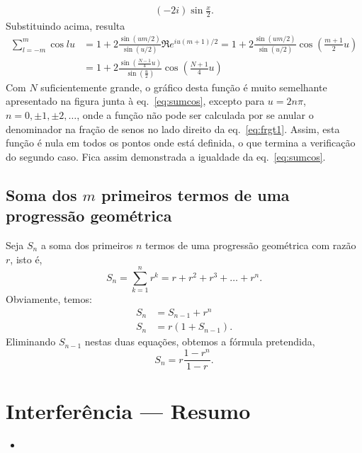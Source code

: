 {\begin{align*}
(-2i)\sin\frac{x}{2}.
\end{align*}
Substituindo acima, resulta
\begin{align}
\sum_{l=-m}^m\cos lu &= 1+2\frac{\sin(um/2)}{\sin(u/2)}\Re e^{iu(m+1)/2}=
1+2\frac{\sin(um/2)}{\sin(u/2)}\cos\left(\frac{m+1}{2}u\right)\nonumber\\
&=1+ 2\frac{\sin\left(\frac{N-1}{4}u\right)}{\sin\left(\frac{u}{2}\right)}
\cos\left(\frac{N+1}{4}u\right)\label{eq:frgt1}
\end{align}
Com $N$ suficientemente grande, o gráfico desta função é muito semelhante
apresentado na figura junta à eq.~\eqref{eq:sumcos}, excepto para $u=2n\pi$,
$n=0,\pm1,\pm2,\ldots$, onde a função não pode ser calculada por se anular o
denominador na fração de senos no lado direito da eq.~\eqref{eq:frgt1}. Assim,
esta função é nula em todos os pontos onde está definida, o que termina a
verificação do segundo caso.  Fica assim demonstrada a igualdade da
eq.~\eqref{eq:sumcos}.
\subsection*{Soma dos $m$ primeiros termos de uma progressão geométrica}
Seja $S_n$ a soma dos primeiros $n$ termos de uma progressão geométrica com
razão $r$, isto é,
\begin{equation*}
S_n=\sum_{k=1}^nr^k=r+r^2+r^3+\ldots+r^n.
\end{equation*}
Obviamente, temos:
\begin{align*}
S_{n}&=S_{n-1}+r^{n}\\
S_{n}&=r(1+S_{n-1}).
\end{align*}
Eliminando $S_{n-1}$ nestas duas equações, obtemos a fórmula pretendida,
\begin{equation*}
S_n=r\frac{1-r^n}{1-r}.
\end{equation*}
}
\newpage
\section*{Interferência --- Resumo}
\tobedone{}
\begin{itemize}[leftmargin=*]
  \item
\end{itemize}
